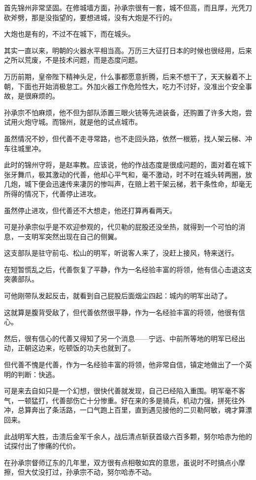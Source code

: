 \begin{multicols}{\theparacolNo}
		首先锦州非常坚固。在修城墙方面，孙承宗很有一套，城不但高，而且厚，光凭刀砍斧劈，那是没指望的，要想进城，没有大炮是不行的。

		大炮也是有的，不过不在城下，而在城头。

		其实一直以来，明朝的火器水平相当高。万历三大征打日本的时候也很经用，后来之所以荒废，不是技术问题，而是态度问题。

		万历前期，皇帝陛下精神头足，什么事都愿意折腾，后来不想干了，天天躲着不上朝，下面也开始消极怠工。外加火器工作危险性大，吃力不讨好，没准出个安全事故，是很麻烦的。

		孙承宗不怕麻烦，他不但为部队添置三眼火铳等先进装备，还购置了许多大炮，尝试用火炮守城。而锦州，就是他的试点城市。

		虽然情况不妙，但代善不走寻常路，也不走回头路，依然一根筋，找人架云梯、冲车往城里冲。

		此时的锦州守将，是赵率教。应该说，他的作战态度是很成问题的，面对着在城下张牙舞爪，极其激动的代善，他却心平气和，毫不激动，时不时在城头转两圈，放几炮，城下便会迅速传来凄厉的惨叫声，在赔上若干架云梯，若干条性命，却毫无所得的情况下，代善停止进攻。

		虽然停止进攻，但代善还不大想走，他还打算再看两天。

		可是孙承宗似乎是不欢迎参观的，代贝勒的屁股还没坐热，就得到一个可怕的消息，一支明军突然出现在自己的侧翼。

		这支部队是驻守前屯、松山的明军，听说客人来了，没赶上接风，特来送行。

		在短暂慌乱之后，代善恢复了平静，作为一名经验丰富的将领，他有信心击退这支突袭部队。

		可他刚带队发起反击，就看到自己屁股后面烟尘四起：城内的明军出动了。

		这就算是腹背受敌了，但代善依然很平静，作为一名经验丰富的将领，他很有信心。

		然后，很有信心的代善又得知了另一个消息——宁远、中前所等地的明军已经出动，正朝这边来，吃顿饭的功夫也就到了。

		但代善不愧是代善，作为一名经验丰富的将领，他非常自信，镇定地做出了一个英明的判断：快逃。

		可是来去自如只是一个幻想，很快代善就发现，自己已经陷入重围。明军毫不客气，一顿猛打，代善部伤亡十分惨重。好在来的多是骑兵，机动力强，拼死往外冲，总算奔出了条活路，一口气跑上百里，直到遇见接他的二贝勒阿敏，魂才算漂回来。

		此战明军大胜，击溃后金军千余人，战后清点斩获首级六百多颗，努尔哈赤为他的试探付出了惨痛的代价。

		在孙承宗督师辽东的几年里，双方很有点相敬如宾的意思，虽说时不时搞点小摩擦，但大仗没打过，孙承宗不动，努尔哈赤不动。


\end{multicols}
